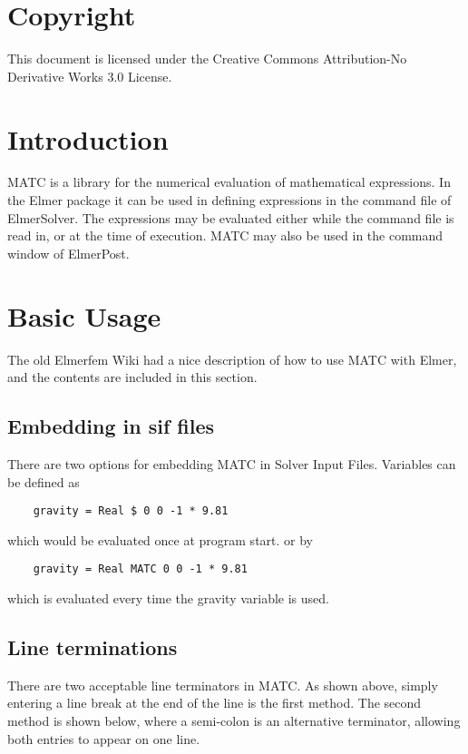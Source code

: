 \section*{Copyright}

This document is licensed under the Creative Commons Attribution-No Derivative Works 3.0 License. 


\section{Introduction}
MATC is a library for the numerical evaluation of mathematical expressions. In the Elmer 
package it can be used in defining expressions in the command file of ElmerSolver. The expressions
may be evaluated either while the command file is read in, or at the time of execution.
MATC may also be used in the command window of ElmerPost.   

\section{Basic Usage}
The old Elmerfem Wiki had a nice description of how to use MATC with Elmer, and the contents
are included in this section.

\subsection{Embedding in sif files}

There are two options for embedding MATC in Solver Input Files. Variables can be defined as

\begin{verbatim}
    gravity = Real $ 0 0 -1 * 9.81
\end{verbatim}

\noindent which would be evaluated once at program start. or by

\begin{verbatim}
    gravity = Real MATC 0 0 -1 * 9.81
\end{verbatim}

\noindent which is evaluated every time the gravity variable is used.

\subsection{Line terminations}

There are two acceptable line terminators in MATC.  As shown above, simply entering a line break at
the end of the line is the first method.  The second method is shown below, where a semi-colon
is an alternative terminator, allowing both entries to appear on one line.

